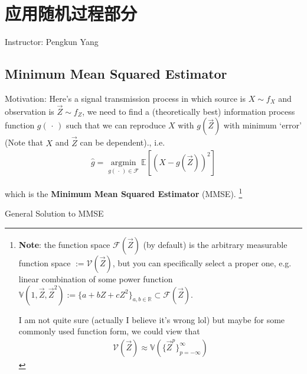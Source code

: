 \section{应用随机过程部分}
\begin{center}
    Instructor: Pengkun Yang 
\end{center}

    





\subsection{Minimum Mean Squared Estimator}\label{SubSecMMSE}
    Motivation: Here's a signal transmission process in which source is $ X\sim f_{X} $ and observation is $ \vec{Z}\sim f_Z $, we need to find a (theoretically best) information process function $ g(\, \cdot \, ) $ such that we can reproduce $ X $ with $ g(\vec{Z}) $ with minimum `error' (Note that $ X$ and $\vec{Z} $ can be dependent)., i.e.
    \begin{align*}
        \hat{g}=\mathop{\arg\min}\limits_{g(\, \cdot \, )\in \mathscr{F}} \mathbb{E}\left[ (X-g(\vec{Z}))^2 \right] 
    \end{align*}

    which is the \textbf{Minimum Mean Squared Estimator} (MMSE). \footnote{\textbf{Note}: the function space $ \mathscr{F}(\vec{Z}) $ (by default) is the arbitrary measurable function space $ :=\mathscr{V}(\vec{Z}) $, but you can specifically select a proper one, e.g. linear combination of some power function $ \mathbb{V}(1,\vec{Z},\vec{Z}^2):=\{a+bZ+cZ^2\}_{a,b\in\mathbb{R}}\subset \mathscr{F}(\vec{Z}) $.
    
    I am not quite sure (actually I believe it's wrong lol) but maybe for some commonly used function form, we could view that
    \begin{align*}
        \mathscr{V}(\vec{Z})\approx \mathbb{V}(\{\vec{Z}^p\}_{p=-\infty}^\infty) 
    \end{align*}
    
    }

\begin{point}
    General Solution to MMSE
\end{point}

